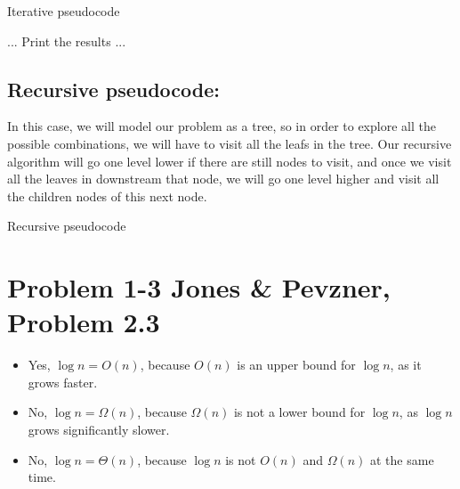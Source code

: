 \documentclass{article}
\begin{document}
\begin{algorithm}[H]
\caption{Iterative pseudocode}
\begin{algorithmic}[1]
  \State ...
   \State Print the results
  \EndFor
  \State ...
 \EndFor
\EndFor
\end{algorithmic}
\end{algorithm}

\subsection*{Recursive pseudocode:}

In this case, we will model our problem as a tree, so in order to explore all the possible combinations, we will have to visit all the leafs in the tree. Our recursive algorithm will go one level lower if there are still nodes to visit, and once we visit all the leaves in downstream that node, we will go one level higher and visit all the children nodes of this next node.

\begin{algorithm}[H]
\caption{Recursive pseudocode}
\begin{algorithmic}[1]

  \EndFor
 \EndIf
\EndFunction
\end{algorithmic}
\end{algorithm}

\section*{Problem 1-3 Jones \& Pevzner, Problem 2.3}

\begin{itemize}

\item Yes, $\log n = O(n)$, because $O(n)$ is an upper bound for $\log n$, as it grows faster.

\item No, $\log n = \Omega(n)$, because $\Omega(n)$ is not a lower bound for $\log n$, as $\log n$ grows significantly slower.

\item No, $\log n = \Theta(n)$, because $\log n$ is not $O(n)$ and $\Omega(n)$ at the same time.

\end{itemize}
\end{document}
